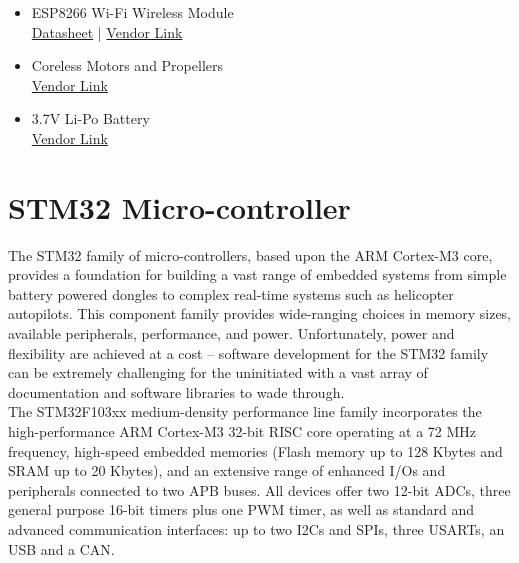 \documentclass[a4paper,12pt,oneside]{book}
\begin{document}
\begin{itemize}
\begin{itemize}
\item ESP8266 Wi-Fi Wireless Module\\
\href{./datasheets/ESP8266-Datasheet.pdf}{Datasheet} | \href{http://www.amazon.in/ESP8266-Serial-Wireless-Arduino-Raspberry/dp/B00TS5TMRK/ref=sr_1_3?ie=UTF8&qid=1499068563&sr=8-3&keywords=ESP8266}{Vendor Link}

\item Coreless Motors and Propellers \\
\href{http://www.amazon.in/Engineerstoys-Coreless-Motor-Propeller-Set/dp/B01HTIN6CE/ref=sr_1_2?ie=UTF8&qid=1499068914&sr=8-2&keywords=coreless+motor}{Vendor Link}

\item 3.7V Li-Po Battery \\
\href{http://www.amazon.in/Generic-Cheerson-Quadcopter-Ariplane-shipping/dp/B071XYV3HR/ref=sr_1_8?ie=UTF8&qid=1499068765&sr=8-8&keywords=3.7v+lipo}{Vendor Link}

\end{itemize}
\end{itemize}

\section{STM32 Micro-controller}
The STM32 family of micro-controllers, based upon the ARM Cortex-M3 core, provides a foundation for building a vast range of embedded systems from simple battery powered dongles to complex real-time systems such as helicopter autopilots. This component family provides wide-ranging choices in memory sizes, available peripherals, performance, and power. Unfortunately, power and flexibility are achieved at a cost – software development for the STM32 family can be extremely challenging for the uninitiated with a vast array of documentation and software libraries to wade through.\cite{geob} \\

The STM32F103xx medium-density performance line family incorporates the high-performance ARM Cortex-M3 32-bit RISC core operating at a 72 MHz frequency, high-speed embedded memories (Flash memory up to 128 Kbytes and SRAM up to 20 Kbytes), and an extensive range of enhanced I/Os and peripherals connected to two APB buses. All devices offer two 12-bit ADCs, three general purpose 16-bit timers plus one PWM timer, as well as standard and advanced communication interfaces: up to two I2Cs and SPIs, three USARTs, an USB and a CAN.\cite{stm32}
\end{document}
